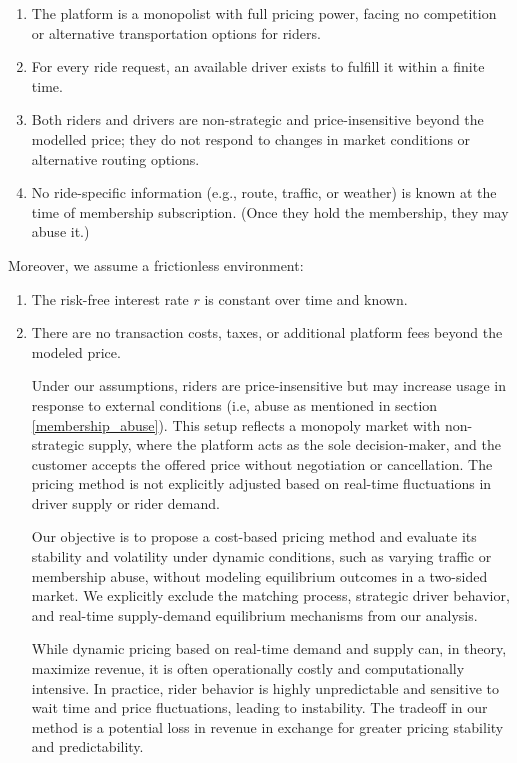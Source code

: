 \documentclass[12pt]{article}
\begin{document}
{{{{{\begin{enumerate}[label={(A$_{\arabic*}$)}, ref={(A$_{\arabic*}$)}]
	\item The platform is a monopolist with full pricing power, facing no competition or alternative transportation options for riders.
	
	\item For every ride request, an available driver exists to fulfill it within a finite time.
	
	\item Both riders and drivers are non-strategic and price-insensitive beyond the modelled price; they do not respond to changes in market conditions or alternative routing options.
	
	\item No ride-specific information (e.g., route, traffic, or weather) is known at the time of membership subscription. (Once  they hold the membership, they may abuse it.)
\end{enumerate}


Moreover, we assume a frictionless environment:
\begin{enumerate}[label={(B$_{\arabic*}$)}, ref={(B$_{\arabic*}$)}]  
	\item The risk-free interest rate $r$ is constant over time and known. \label{frictionless}
	
	
	\item  There are no transaction costs, taxes, or additional platform fees beyond the modeled price.
	
	
	Under our assumptions, riders are price-insensitive but may increase usage in response to external conditions (i.e, abuse  as mentioned in section \ref{membership_abuse}).  This setup reflects a monopoly market with non-strategic supply, where the platform acts as the sole decision-maker, and the customer accepts the offered price without negotiation or cancellation. The pricing method is not explicitly adjusted based on real-time fluctuations in driver supply or rider demand. 
	
Our objective is to propose a cost-based pricing method and evaluate its stability and volatility under dynamic conditions, such as varying traffic or membership abuse, without modeling equilibrium outcomes in a two-sided market. 	We explicitly exclude the matching process, strategic driver behavior, and real-time supply-demand equilibrium mechanisms from our analysis.

While dynamic pricing based on real-time demand and supply can, in theory, maximize revenue, it is often operationally costly and computationally intensive. In practice, rider behavior is highly unpredictable and sensitive to wait time and price fluctuations, leading to instability. The tradeoff in our method  is a potential loss in revenue in exchange for greater pricing stability and predictability.
\end{enumerate}

}}}}}
\end{document}
